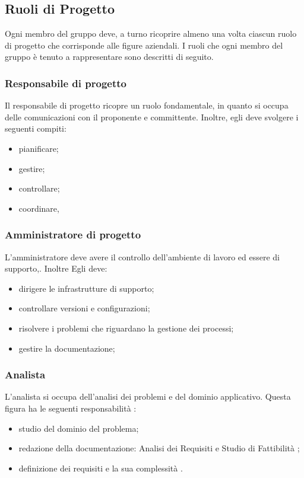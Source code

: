 \subsection{Ruoli di Progetto}
Ogni membro del gruppo deve, a turno ricoprire almeno una volta ciascun ruolo di progetto che corrisponde alle figure aziendali. I ruoli che ogni membro del gruppo è tenuto a rappresentare sono descritti di seguito.



\subsubsection{Responsabile di progetto}
Il responsabile di progetto ricopre un ruolo fondamentale, in quanto si occupa delle comunicazioni con il proponente e committente. Inoltre, egli deve svolgere i seguenti compiti:
\begin{itemize}
\item pianificare;
\item gestire;
\item controllare;
\item coordinare,
\end{itemize}

\subsubsection{Amministratore di progetto}
L'amministratore deve avere il controllo dell'ambiente di lavoro ed essere di supporto,. Inoltre Egli deve: 
\begin{itemize}
\item dirigere le infrastrutture di supporto;
\item controllare versioni e configurazioni;
\item risolvere i problemi che riguardano la gestione dei processi;
\item gestire la documentazione;
\end{itemize}


\subsubsection{Analista}
L'analista si occupa dell'analisi dei problemi e del dominio applicativo. Questa figura ha le seguenti responsabilità :
\begin{itemize}
\item studio del dominio del problema; 
\item redazione della documentazione: Analisi dei Requisiti e Studio di Fattibilità ;
\item definizione dei requisiti e la sua complessità .
\end{itemize}
